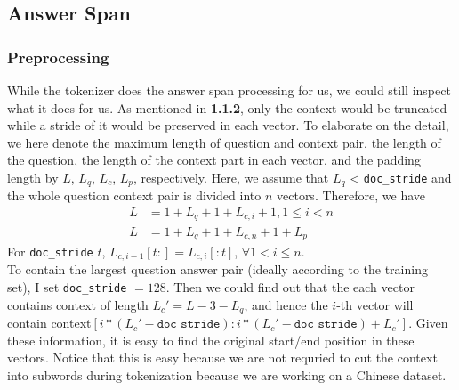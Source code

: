 \documentclass{homeworg}
\newcommand{\hug}{\emoji{hugs}\phantom{x}}
\begin{document}
\subsection{Answer Span}
\subsubsection{Preprocessing}
While the \hug tokenizer does the answer span processing for us, we could still inspect what it does for us. 
As mentioned in \textbf{1.1.2}, only the context would be truncated while a stride of it would be preserved in each vector. To elaborate on the detail, we here denote the maximum length of question and context pair, the length of the question, the length of the context part in each vector, and the padding length by $L$, $L_q$, $L_c$, $L_p$, respectively. Here, we assume that $L_q$ < \texttt{doc\_stride} and the whole question context pair is divided into $n$ vectors. Therefore, we have 
\begin{align*}
    L & = 1 + L_q + 1 + L_{c,i} + 1, 1 \leq i < n \\
    L & = 1 + L_q + 1 + L_{c,n} + 1 + L_p 
\end{align*}
For \texttt{doc\_stride} $t$, $L_{c,i - 1}[t:] = L_{c,i}[:t]$, $\forall 1 < i \leq n$. \\
To contain the largest question answer pair (ideally according to the training set), I set \texttt{doc\_stride} $= 128$.  Then we could find out that the each vector contains context of length $L_c' = L - 3 - L_q$, and hence the $i$-th vector will contain context$[i * (L_c' - \texttt{doc\_stride}): i * (L_c' - \texttt{doc\_stride}) + L_c' ]$. Given these information, it is easy to find the original start/end position in these vectors. Notice that this is easy because we are not requried to cut the context into subwords during tokenization because we are working on a Chinese dataset.
\end{document}
